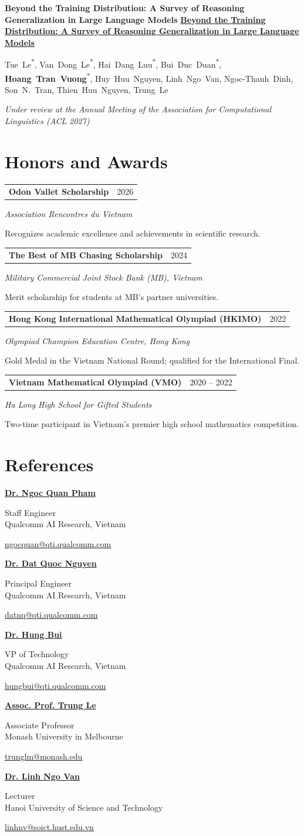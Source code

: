 \documentclass[letterpaper,11pt]{article}
\makeatletter
\newcommand{\me}{\textbf{Hoang Tran Vuong}}
\newcommand{\equal}{\textsuperscript{*}}
\newcommand{\authorname}[1]{\mbox{#1}}
\newcommand{\publication}[4]{%
  \par\addvspace{8pt}%
  \begin{minipage}[t]{\linewidth}
    \fontsize{11}{13.4}\selectfont
    \RaggedRight\hyphenpenalty=10000\exhyphenpenalty=10000
    \if\relax\detokenize{#1}\relax
      \textcolor{CVBlue}{\textbf{#2}}%
    \else
      \href{#1}{\textbf{#2}}%
    \fi\par
    #3\par
    \textit{#4}
  \end{minipage}\par
}
\newcommand{\award}[4]{%
  \par\addvspace{7pt}%
  \begin{minipage}[t]{\linewidth}
    \begin{tabularx}{\linewidth}{@{}Xr@{}}
      \textbf{#1} & #2
    \end{tabularx}\par
    \textit{#3}\par
    #4
  \end{minipage}\par
}
\newcommand{\cvreference}[4]{%
  \begin{minipage}[t]{\linewidth}
    \href{#1}{\textbf{#2}}\par
    #3\par
    \href{mailto:#4}{#4}
  \end{minipage}\par
}
\makeatother
\begin{document}
\publication{}
  {Beyond the Training Distribution: A Survey of Reasoning Generalization in Large Language Models}
  {\authorname{Tue Le\equal}, \authorname{Van Dong Le\equal}, \authorname{Hai Dang Luu\equal}, \authorname{Bui Duc Duan\equal}, \authorname{\me\equal}, \authorname{Huy Huu Nguyen}, \authorname{Linh Ngo Van}, \authorname{Ngoc-Thanh Dinh}, \authorname{Son N. Tran}, \authorname{Thien Huu Nguyen}, \authorname{Trung Le}}
  {Under review at the Annual Meeting of the Association for Computational Linguistics (ACL 2027)}

\section{Honors and Awards}
\award{Odon Vallet Scholarship}{2026}
  {Association Rencontres du Vietnam}
  {Recognizes academic excellence and achievements in scientific research.}
\award{The Best of MB Chasing Scholarship}{2024}
  {Military Commercial Joint Stock Bank (MB), Vietnam}
  {Merit scholarship for students at MB's partner universities.}
\award{Hong Kong International Mathematical Olympiad (HKIMO)}{2022}
  {Olympiad Champion Education Centre, Hong Kong}
  {Gold Medal in the Vietnam National Round; qualified for the International Final.}
\award{Vietnam Mathematical Olympiad (VMO)}{2020 -- 2022}
  {Ha Long High School for Gifted Students}
  {Two-time participant in Vietnam's premier high school mathematics competition.}

\section{References}
\begin{minipage}[t]{0.48\linewidth}
  \cvreference{https://scholar.google.com/citations?user=AzzJssIAAAAJ}
    {Dr. Ngoc Quan Pham}
    {Staff Engineer\\Qualcomm AI Research, Vietnam}
    {ngocquan@qti.qualcomm.com}
  \vspace{8pt}
  \cvreference{https://scholar.google.com/citations?user=HVl7vyEAAAAJ}
    {Dr. Dat Quoc Nguyen}
    {Principal Engineer\\Qualcomm AI Research, Vietnam}
    {datnq@qti.qualcomm.com}
  \vspace{8pt}
  \cvreference{https://scholar.google.com/citations?user=mDLwSZAAAAAJ}
    {Dr. Hung Bui}
    {VP of Technology\\Qualcomm AI Research, Vietnam}
    {hungbui@qti.qualcomm.com}
\end{minipage}\hfill
\begin{minipage}[t]{0.48\linewidth}
  \cvreference{https://scholar.google.com/citations?user=gysdMxwAAAAJ}
    {Assoc. Prof. Trung Le}
    {Associate Professor\\Monash University in Melbourne}
    {trunglm@monash.edu}
  \vspace{8pt}
  \cvreference{https://scholar.google.com/citations?user=tZ78MoQAAAAJ}
    {Dr. Linh Ngo Van}
    {Lecturer\\Hanoi University of Science and Technology}
    {linhnv@soict.hust.edu.vn}
\end{minipage}
\end{document}
